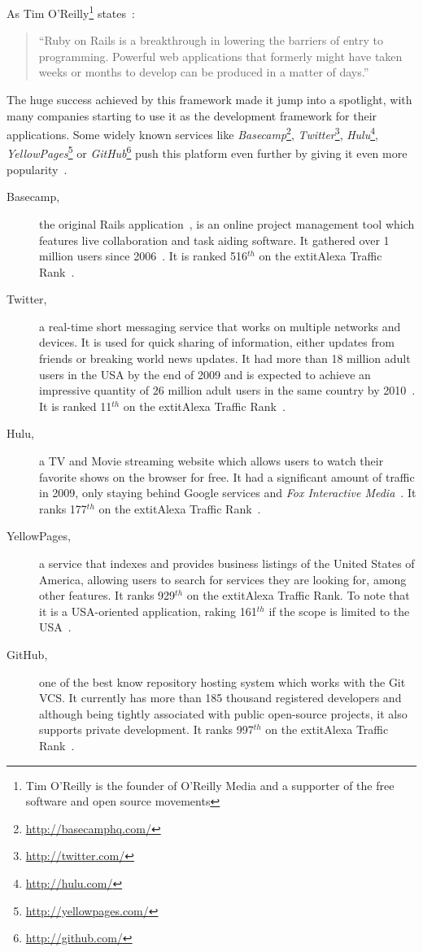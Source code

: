 As Tim O'Reilly\footnote{Tim O'Reilly is the founder of O'Reilly Media and a supporter of the free software and open source movements} states~\cite{oreilly_ror}:
\begin{quote}
  ``Ruby on Rails is a breakthrough in lowering the barriers of entry to programming. Powerful web applications that formerly might have taken weeks or months to develop can be produced in a matter of days.''
\end{quote}
The huge success achieved by this framework made it jump into a spotlight, with many companies starting to use it as the development framework for their applications. Some widely known services like \textit{Basecamp}\footnote{\url{http://basecamphq.com/}}, \textit{Twitter}\footnote{\url{http://twitter.com/}}, \textit{Hulu}\footnote{\url{http://hulu.com/}}, \textit{YellowPages}\footnote{\url{http://yellowpages.com/}} or \textit{GitHub}\footnote{\url{http://github.com/}} push this platform even further by giving it even more popularity~\cite{rubyonrails_applications}.
\begin{description}
  \item[Basecamp,] the original Rails application~\cite{rubyonrails_applications}, is an online project management tool which features live collaboration and task aiding software. It gathered over 1 million users since 2006~\cite{basecamp_turns_1000000}. It is ranked 516$^{th}$ on the 	extit{Alexa Traffic Rank}~\cite{alexa}.
  \item[Twitter,] a real-time short messaging service that works on multiple networks and devices. It is used for quick sharing of information, either updates from friends or breaking world news updates. It had more than 18 million adult users in the USA by the end of 2009 and is expected to achieve an impressive quantity of 26 million adult users in the same country by 2010~\cite{emarketer_twitter_usage}. It is ranked 11$^{th}$ on the 	extit{Alexa Traffic Rank}~\cite{alexa}.
  \item[Hulu,] a TV and Movie streaming website which allows users to watch their favorite shows on the browser for free. It had a significant amount of traffic in 2009, only staying behind Google services and \textit{Fox Interactive Media}~\cite{hulu_growth}. It ranks 177$^{th}$ on the 	extit{Alexa Traffic Rank}~\cite{alexa}.
  \item[YellowPages,] a service that indexes and provides business listings of the United States of America, allowing users to search for services they are looking for, among other features. It ranks 929$^{th}$ on the 	extit{Alexa Traffic Rank}. To note that it is a USA-oriented application, raking 161$^{th}$ if the scope is limited to the USA~\cite{alexa}.
  \item[GitHub,] one of the best know repository hosting system which works with the Git VCS. It currently has more than 185 thousand registered developers and although being tightly associated with public open-source projects, it also supports private development. It ranks 997$^{th}$ on the 	extit{Alexa Traffic Rank}~\cite{alexa}.
\end{description}
